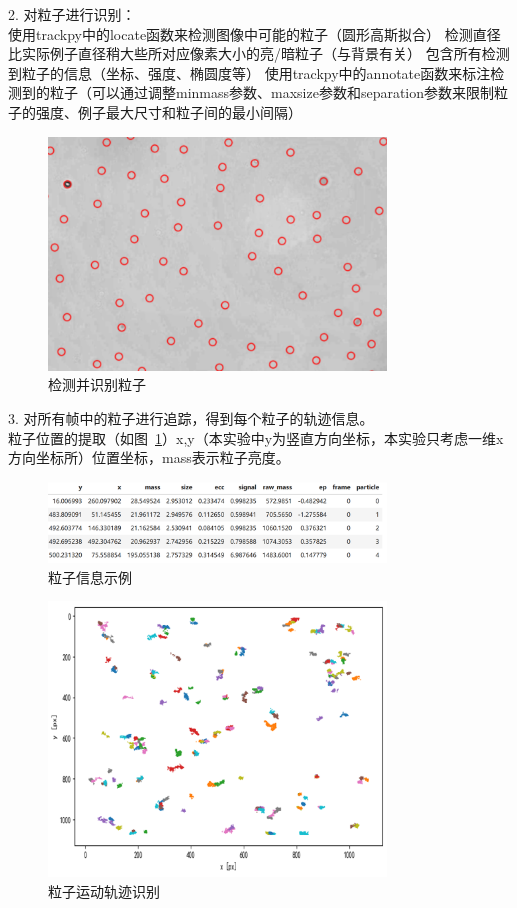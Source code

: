 \documentclass[a4paper]{report} %
\begin{document}
2. 对粒子进行识别：\\
使用trackpy中的locate函数来检测图像中可能的粒子（圆形高斯拟合）
检测直径比实际例子直径稍大些所对应像素大小的亮/暗粒子（与背景有关）
包含所有检测到粒子的信息（坐标、强度、椭圆度等）
使用trackpy中的annotate函数来标注检测到的粒子（可以通过调整minmass参数、maxsize参数和separation参数来限制粒子的强度、例子最大尺寸和粒子间的最小间隔）
\begin{figure}[H]
    \centering
    \includegraphics[width=0.8\textwidth]{识别粒子.png}
    \caption{检测并识别粒子}
\end{figure} 
3. 对所有帧中的粒子进行追踪，得到每个粒子的轨迹信息。\\
粒子位置的提取（如图~\ref{fig:guijitu}）x,y（本实验中y为竖直方向坐标，本实验只考虑一维x方向坐标所）位置坐标，mass表示粒子亮度。
\begin{figure}[H]
    \centering
    \includegraphics[width=0.8\textwidth]{粒子信息.png}
    \caption{粒子信息示例}
\end{figure} 
\begin{figure}[H]
    \centering
    \includegraphics[width=0.8\textwidth]{粒子轨迹图.png}
    \caption{粒子运动轨迹识别}
    \label{fig:guijitu}
\end{figure} 
\end{document}
